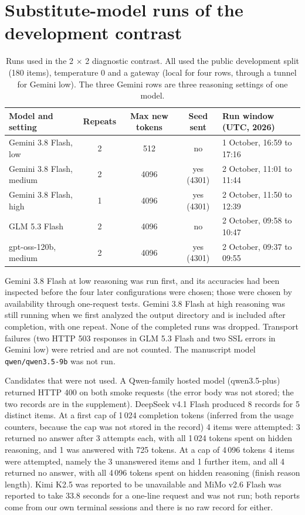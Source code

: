 \section{Substitute-model runs of the development contrast}
\label{app:subs}
\begin{table}[h]
\centering\small
\caption{Runs used in the 2 $\times$ 2 diagnostic contrast. All used the public development split (180 items), temperature 0 and a gateway (local for four rows, through a tunnel for Gemini low). The three Gemini rows are three reasoning settings of one model.}
\begin{tabularx}{\linewidth}{lcccX}
\toprule
Model and setting & Repeats & Max new tokens & Seed sent & Run window (UTC, 2026) \\
\midrule
Gemini 3.8 Flash, low & 2 & 512 & no & 1 October, 16:59 to 17:16 \\
Gemini 3.8 Flash, medium & 2 & 4096 & yes (4301) & 2 October, 11:01 to 11:44 \\
Gemini 3.8 Flash, high & 1 & 4096 & yes (4301) & 2 October, 11:50 to 12:39 \\
GLM 5.3 Flash & 2 & 4096 & no & 2 October, 09:58 to 10:47 \\
gpt-oss-120b, medium & 2 & 4096 & yes (4301) & 2 October, 09:37 to 09:55 \\
\bottomrule
\end{tabularx}
\end{table}
Gemini 3.8 Flash at low reasoning was run first, and its accuracies had been inspected before the four later configurations were chosen; those were chosen by availability through one-request tests. Gemini 3.8 Flash at high reasoning was still running when we first analyzed the output directory and is included after completion, with one repeat. None of the completed runs was dropped. Transport failures (two HTTP 503 responses in GLM 5.3 Flash and two SSL errors in Gemini low) were retried and are not counted. The manuscript model \texttt{qwen/qwen3.5-9b} was not run.

Candidates that were not used. A Qwen-family hosted model (qwen3.5-plus) returned HTTP 400 on both smoke requests (the error body was not stored; the two records are in the supplement). DeepSeek v4.1 Flash produced 8 records for 5 distinct items. At a first cap of 1\,024 completion tokens (inferred from the usage counters, because the cap was not stored in the record) 4 items were attempted: 3 returned no answer after 3 attempts each, with all 1\,024 tokens spent on hidden reasoning, and 1 was answered with 725 tokens. At a cap of 4\,096 tokens 4 items were attempted, namely the 3 unanswered items and 1 further item, and all 4 returned no answer, with all 4\,096 tokens spent on hidden reasoning (finish reason length). Kimi K2.5 was reported to be unavailable and MiMo v2.6 Flash was reported to take 33.8 seconds for a one-line request and was not run; both reports come from our own terminal sessions and there is no raw record for either.

